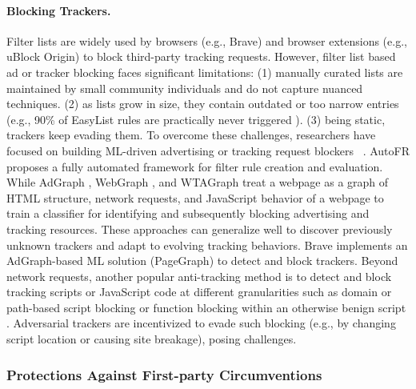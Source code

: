\paragraph{Blocking Trackers.}
Filter lists are widely used by browsers (e.g., Brave) and browser extensions (e.g., uBlock Origin) to block third-party tracking requests.
%
However, filter list based ad or tracker blocking faces significant limitations: 
%
(1) manually curated lists are maintained by small community individuals and do not capture nuanced techniques. 
%
(2) as lists grow in size, they contain outdated or too narrow entries (e.g., 90\% of EasyList rules are practically never triggered \cite{snyderWhoFiltersFilters2020}).
%
(3) being static, trackers keep evading them.
%
To overcome these challenges, researchers have focused on building ML-driven advertising or tracking request blockers ~\cite{iqbalAdGraphGraphBasedApproach2020, sibyWebGraphCapturingAdvertising2022, yangWTAGRAPHWebTracking2022, leAutoFRAutomatedFilter2023}.
%
AutoFR \cite{leAutoFRAutomatedFilter2023} proposes a fully automated framework for filter rule creation and evaluation.
%
While AdGraph \cite{iqbalAdGraphGraphBasedApproach2020}, WebGraph \cite{sibyWebGraphCapturingAdvertising2022}, and WTAGraph \cite{yangWTAGRAPHWebTracking2022} treat a webpage as a graph of HTML structure, network requests, and JavaScript behavior of a webpage to train a classifier for identifying and subsequently blocking advertising and tracking resources.
%
These approaches can generalize well to discover previously unknown trackers and adapt to evolving tracking behaviors. 
%
Brave implements an AdGraph-based ML solution (PageGraph) to detect and block trackers.
%
Beyond network requests, another popular anti-tracking method is to detect and block tracking scripts or JavaScript code at different granularities such as domain or path-based script blocking or function blocking within an otherwise benign script \cite{ikramSeamlessTrackingFreeWeb2017,alrizahErrorsMisunderstandingsAttacks2019,snyderWhoFiltersFilters2020,smithSugarCoatProgrammaticallyGenerating2021,chenDetectingFilterList2021,daoCNAMECloakingBasedTracking2021,leCVInspectorAutomatingDetection2021,amjadTrackerSiftUntanglingMixed2021,amjadBlockingJavaScriptBreaking2023,amjadBlockingTrackingJavaScript2024}.%
Adversarial trackers are incentivized to evade such blocking (e.g., by changing script location or causing site breakage), posing challenges.



\subsubsection{Protections Against First-party Circumventions}

